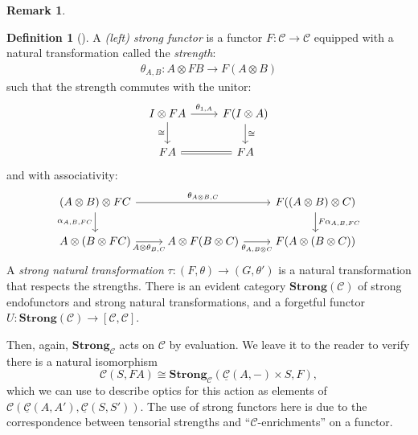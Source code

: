 \documentclass[11pt,letterpaper]{article}
\theoremstyle{plain}
\theoremstyle{definition}
\newtheorem{definition}[theorem]{Definition}
\newtheorem{remark}[theorem]{Remark}
\newcommand{\C}{\mathscr{C}}
\newcommand{\homC}{\underline{\C}}
\newcommand{\Strong}{\mathbf{Strong}}
\newcommand{\todo}[1]{\textcolor{red}{\small #1}}
\begin{document}
\begin{remark}
\begin{definition}[\cite{StrongFunctors}]\label{def:strong-functor}
  A \emph{(left) strong functor} is a functor $F : \C \to \C$ equipped with a natural transformation called the \emph{strength}:
  \begin{align*}
    \theta_{A,B} : A \otimes F B \to F(A \otimes B)
  \end{align*}
  such that the strength commutes with the unitor:
  \[
    \begin{tikzcd}
      I \otimes F A \ar[r, "\theta_{1,A}"] \ar[d, "\cong" left]  & F(I \otimes A) \ar[d, "\cong" right] \\
      F A \ar[r, equals] & F A
    \end{tikzcd}
  \]
  and with associativity:
  \[
    \begin{tikzcd}
      (A \otimes B) \otimes F C \ar[rr, "\theta_{A \otimes B, C}"] \ar[d, "\alpha_{A,B,FC}" left]  && F((A \otimes B) \otimes C) \ar[d, "F\alpha_{A,B,FC}" right] \\
      A \otimes (B \otimes F C) \ar[r, "A \otimes \theta_{B,C}" below] & A \otimes F(B \otimes C) \ar[r, "\theta_{A, B\otimes C}" below] & F(A \otimes (B \otimes C))
    \end{tikzcd}
  \]
  A \emph{strong natural transformation} $\tau : (F,\theta) \to (G,\theta')$ is a natural transformation that respects the strengths. There is an evident category $\Strong(\C)$ of strong endofunctors and strong natural transformations, and a forgetful functor $U : \Strong(\C) \to [\C, \C]$.
%
\end{definition}
Then, again, $\Strong_\C$ acts on $\C$ by evaluation. We leave it to the reader to verify there is a natural isomorphism \[\C(S, FA) \cong \Strong_\C(\homC(A, -) \times S, F),\] which we can use to describe optics for this action as elements of $\C(\homC(A, A'), \homC(S,S'))$. The use of strong functors here is due to the correspondence between tensorial strengths and ``$\C$-enrichments'' on a functor.
\end{remark}

\end{document}
